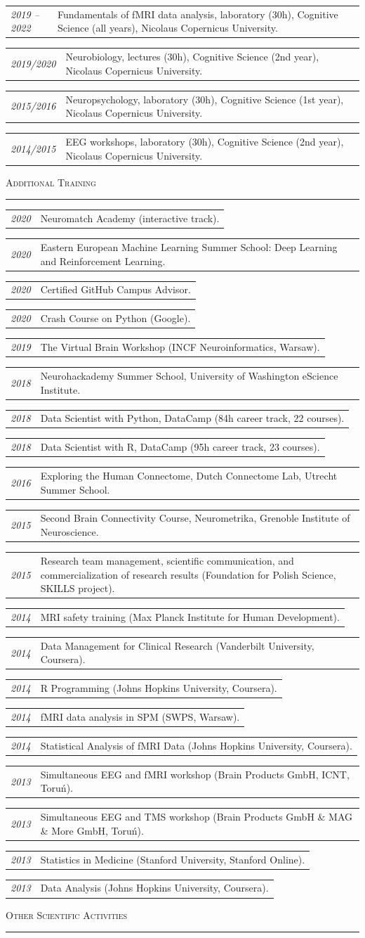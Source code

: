 \documentclass[10pt, a4paper]{article}
\makeatletter
\newcommand{\cvsection}[1]{%
  \vspace{1.4em}%
  {\large\scshape #1}%
  \vspace{0.25em}%
  \par\noindent\textcolor{rule}{\rule{\linewidth}{0.4pt}}%
  \vspace{0.5em}%
}
\newcommand{\cventry}[2]{%
  \begin{tabular*}{\linewidth}{@{}p{2.8cm}@{\hspace{0.5em}}p{\dimexpr\linewidth-3.3cm}@{}}
    \textcolor{accent}{\small\itshape #1} & #2 \\[0.2em]
  \end{tabular*}%
}
\makeatother
\begin{document}
\cventry{2019 -- 2022}{Fundamentals of fMRI data analysis, laboratory (30h), Cognitive Science (all years), Nicolaus Copernicus University.}

\cventry{2019/2020}{Neurobiology, lectures (30h), Cognitive Science (2nd year), Nicolaus Copernicus University.}

\cventry{2015/2016}{Neuropsychology, laboratory (30h), Cognitive Science (1st year), Nicolaus Copernicus University.}

\cventry{2014/2015}{EEG workshops, laboratory (30h), Cognitive Science (2nd year), Nicolaus Copernicus University.}

\cvsection{Additional Training}

\cventry{2020}{Neuromatch Academy (interactive track).}
\cventry{2020}{Eastern European Machine Learning Summer School: Deep Learning and Reinforcement Learning.}
\cventry{2020}{Certified GitHub Campus Advisor.}
\cventry{2020}{Crash Course on Python (Google).}
\cventry{2019}{The Virtual Brain Workshop (INCF Neuroinformatics, Warsaw).}
\cventry{2018}{Neurohackademy Summer School, University of Washington eScience Institute.}
\cventry{2018}{Data Scientist with Python, DataCamp (84h career track, 22 courses).}
\cventry{2018}{Data Scientist with R, DataCamp (95h career track, 23 courses).}
\cventry{2016}{Exploring the Human Connectome, Dutch Connectome Lab, Utrecht Summer School.}
\cventry{2015}{Second Brain Connectivity Course, Neurometrika, Grenoble Institute of Neuroscience.}
\cventry{2015}{Research team management, scientific communication, and commercialization of research results (Foundation for Polish Science, SKILLS project).}
\cventry{2014}{MRI safety training (Max Planck Institute for Human Development).}
\cventry{2014}{Data Management for Clinical Research (Vanderbilt University, Coursera).}
\cventry{2014}{R Programming (Johns Hopkins University, Coursera).}
\cventry{2014}{fMRI data analysis in SPM (SWPS, Warsaw).}
\cventry{2014}{Statistical Analysis of fMRI Data (Johns Hopkins University, Coursera).}
\cventry{2013}{Simultaneous EEG and fMRI workshop (Brain Products GmbH, ICNT, Toru\'n).}
\cventry{2013}{Simultaneous EEG and TMS workshop (Brain Products GmbH \& MAG \& More GmbH, Toru\'n).}
\cventry{2013}{Statistics in Medicine (Stanford University, Stanford Online).}
\cventry{2013}{Data Analysis (Johns Hopkins University, Coursera).}

\cvsection{Other Scientific Activities}
\end{document}
